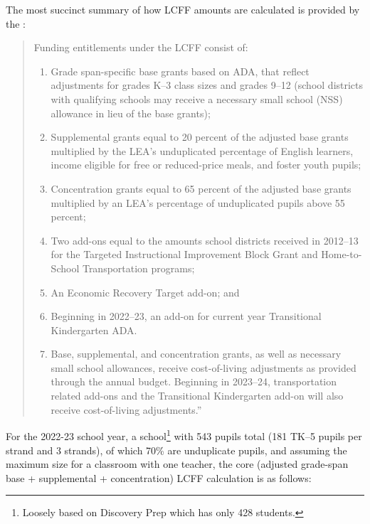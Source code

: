 The most succinct summary of how LCFF amounts are calculated is provided by the \textcite{CDE2023a}:
\begin{quotation}
  \noindent{}Funding entitlements under the LCFF consist of:
  \begin{enumerate}
    \item Grade span-specific base grants based on ADA, that reflect adjustments for grades K–3 class sizes and grades 9–12 (school districts with qualifying schools may receive a necessary small school (NSS) allowance in lieu of the base grants);
    \item Supplemental grants equal to 20 percent of the adjusted base grants multiplied by the LEA’s unduplicated percentage of English learners, income eligible for free or reduced-price meals, and foster youth pupils;
    \item Concentration grants equal to 65 percent of the adjusted base grants multiplied by an LEA’s percentage of unduplicated pupils above 55 percent;
    \item Two add-ons equal to the amounts school districts received in 2012–13 for the Targeted Instructional Improvement Block Grant and Home-to-School Transportation programs;
    \item An Economic Recovery Target add-on; and
    \item Beginning in 2022–23, an add-on for current year Transitional Kindergarten ADA.
    \item Base, supplemental, and concentration grants, as well as necessary small school allowances, receive cost-of-living adjustments as provided through the annual budget. Beginning in 2023–24, transportation related add-ons and the Transitional Kindergarten add-on will also receive cost-of-living adjustments.''
  \end{enumerate}
\end{quotation}

For the 2022-23 school year, a school\footnote{Loosely based on Discovery Prep which has only 428 students.} with 543 pupils total (181 TK–5 pupils per strand and 3 strands), of which 70\% are unduplicate pupils, and assuming the maximum size for a classroom with one teacher, the core (adjusted grade-span base + supplemental + concentration) LCFF calculation is as follows:\label{example_LCFF_calculation}\\\bigskip

